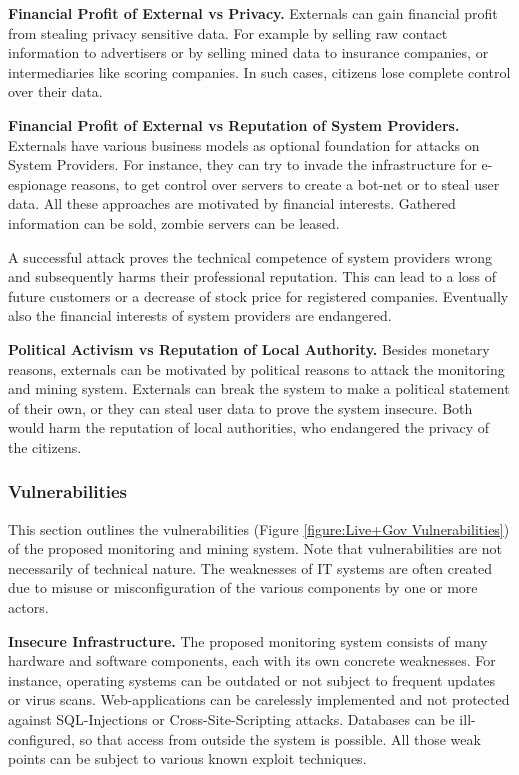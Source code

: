 \textbf{Financial Profit of External vs Privacy.}
Externals can gain financial profit from stealing privacy sensitive data.
For example by selling raw contact information to advertisers or by selling mined data to insurance companies, or intermediaries like scoring companies.
In such cases, citizens lose complete control over their data.

\textbf{Financial Profit of External vs Reputation of System Providers.}
Externals have various business models as optional foundation for attacks on System Providers.
For instance, they can try to invade the infrastructure for e-espionage reasons, to get control over servers to create a bot-net or to steal user data.
All these approaches are motivated by financial interests.
Gathered information can be sold, zombie servers can be leased.

A successful attack proves the technical competence of system providers wrong and subsequently harms their professional reputation.
This can lead to a loss of future customers or a decrease of stock price for registered companies.
Eventually also the financial interests of system providers are endangered.

\textbf{Political Activism vs Reputation of Local Authority.}
Besides monetary reasons, externals can be motivated by political reasons to attack the monitoring and mining system.
Externals can break the system to make a political statement of their own,
or they can steal user data to prove the system insecure.
Both would harm the reputation of local authorities, who endangered the privacy of the citizens.


\subsubsection{Vulnerabilities}
\label{subsubsection:Vulnerabilities}
This section outlines the vulnerabilities (Figure \ref{figure:Live+Gov Vulnerabilities}) of the proposed monitoring and mining system.
Note that vulnerabilities are not necessarily of technical nature.
The weaknesses of IT systems are often created due to misuse or misconfiguration of the various components by one or more actors.



\textbf{Insecure Infrastructure.}
The proposed monitoring system consists of many hardware and software components, each with its own concrete weaknesses.
For instance, operating systems can be outdated or not subject to frequent updates or virus scans.
Web-applications can be carelessly implemented and not protected against SQL-Injections or Cross-Site-Scripting attacks.
Databases can be ill-configured, so that access from outside the system is possible.
All those weak points can be subject to various known exploit techniques.


